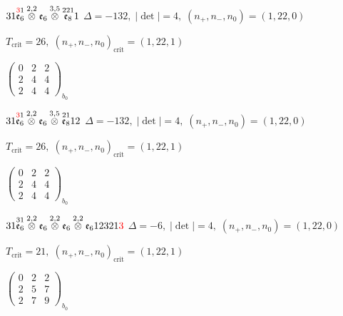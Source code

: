 \documentclass[10pt]{article}
\begin{document}
\smallskip

$31\overset{\textcolor{red}{3}1}{\mathfrak{e}_6}\overset{2,2}{\otimes}\mathfrak{e}_6\overset{3,5}{\otimes}\overset{221}{\mathfrak{e}_8}1$ \quad $\Delta=-132,\; |\det|=4,\; (n_+,n_-,n_0)=(1,22,0)$

\hspace{1em}$T_{\text{crit}}=26,\; (n_+,n_-,n_0)_{\text{crit}}=(1,22,1)$

\hspace{2em}$\left(\begin{smallmatrix}0 & 2 & 2 \\ 2 & 4 & 4 \\ 2 & 4 & 4\end{smallmatrix}\right)_{\!b_0}$

\smallskip

$31\overset{\textcolor{red}{3}1}{\mathfrak{e}_6}\overset{2,2}{\otimes}\mathfrak{e}_6\overset{3,5}{\otimes}\overset{21}{\mathfrak{e}_8}12$ \quad $\Delta=-132,\; |\det|=4,\; (n_+,n_-,n_0)=(1,22,0)$

\hspace{1em}$T_{\text{crit}}=26,\; (n_+,n_-,n_0)_{\text{crit}}=(1,22,1)$

\hspace{2em}$\left(\begin{smallmatrix}0 & 2 & 2 \\ 2 & 4 & 4 \\ 2 & 4 & 4\end{smallmatrix}\right)_{\!b_0}$

\smallskip

$31\overset{31}{\mathfrak{e}_6}\overset{2,2}{\otimes}\mathfrak{e}_6\overset{2,2}{\otimes}\mathfrak{e}_6\overset{2,2}{\otimes}\mathfrak{e}_612321\textcolor{red}{3}$ \quad $\Delta=-6,\; |\det|=4,\; (n_+,n_-,n_0)=(1,22,0)$

\hspace{1em}$T_{\text{crit}}=21,\; (n_+,n_-,n_0)_{\text{crit}}=(1,22,1)$

\hspace{2em}$\left(\begin{smallmatrix}0 & 2 & 2 \\ 2 & 5 & 7 \\ 2 & 7 & 9\end{smallmatrix}\right)_{\!b_0}$
\end{document}
